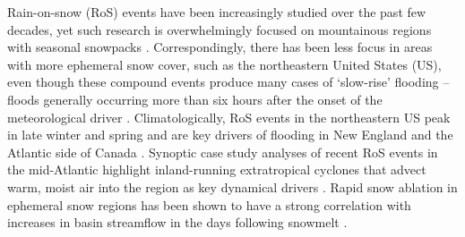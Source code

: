 \documentclass[nhess, manuscript]{copernicus}
\begin{document}

%
%
%
%


\introduction

Rain-on-snow (RoS) events have been increasingly studied over the past few decades, yet such research is overwhelmingly focused on mountainous regions with seasonal snowpacks \citep{singh1997hydrological,mccabe2007rain,wayand2015modeling,sterle2019hydroclimate,musselman2018projected,poschlod2020climate,Hatchett2021,siirila2021a,heggli2022toward,yu2022diverse,brandt2022a,maina2023diverging,haleakala2023watershed}.
Correspondingly, there has been less focus in areas with more ephemeral snow cover, such as the northeastern United States (US), even though these compound events produce many cases of `slow-rise' flooding -- floods generally occurring more than six hours after the onset of the meteorological driver \citep{dougherty2021high}.
Climatologically, RoS events in the northeastern US peak in late winter and spring \citep{ashley2008flood,villarini2010flood,dougherty2019climatology,wachowicz2020rain} and are key drivers of flooding in New England and the Atlantic side of Canada \citep{collins2014annual}.
Synoptic case study analyses of recent RoS events in the mid-Atlantic highlight inland-running extratropical cyclones that advect warm, moist air into the region as key dynamical drivers \citep{grote2021synoptic,suriano2023atmospheric}.
Rapid snow ablation in ephemeral snow regions has been shown to have a strong correlation with increases in basin streamflow in the days following snowmelt \citep{suriano2020discharge,suriano2023atmospheric}.
\end{document}
